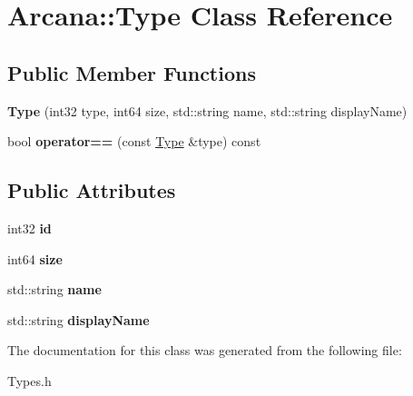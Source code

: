 \hypertarget{class_arcana_1_1_type}{}\section{Arcana\+:\+:Type Class Reference}
\label{class_arcana_1_1_type}
\subsection*{Public Member Functions}
\begin{DoxyCompactItemize}
\item 
\mbox{\label{class_arcana_1_1_type_a38a4eee8130044cec1437519f2bf518b}} 
{\bfseries Type} (int32 type, int64 size, std\+::string name, std\+::string display\+Name)
\item 
\mbox{\label{class_arcana_1_1_type_a9c033c3cfc4c1e43bbe11f1c92be8e4e}} 
bool {\bfseries operator==} (const \mbox{\hyperlink{class_arcana_1_1_type}{Type}} \&type) const
\end{DoxyCompactItemize}
\subsection*{Public Attributes}
\begin{DoxyCompactItemize}
\item 
\mbox{\label{class_arcana_1_1_type_acabd0a0701aab3efb922588737145d89}} 
int32 {\bfseries id}
\item 
\mbox{\label{class_arcana_1_1_type_a51104120a9fe0b8fbce158ccd571fb54}} 
int64 {\bfseries size}
\item 
\mbox{\label{class_arcana_1_1_type_a90be1f6e814fb0f840c1d8e27bcdce66}} 
std\+::string {\bfseries name}
\item 
\mbox{\label{class_arcana_1_1_type_a6b16b11f7ea9ddc03e4b26a0227373ae}} 
std\+::string {\bfseries display\+Name}
\end{DoxyCompactItemize}


The documentation for this class was generated from the following file\+:\begin{DoxyCompactItemize}
\item 
Types.\+h\end{DoxyCompactItemize}
